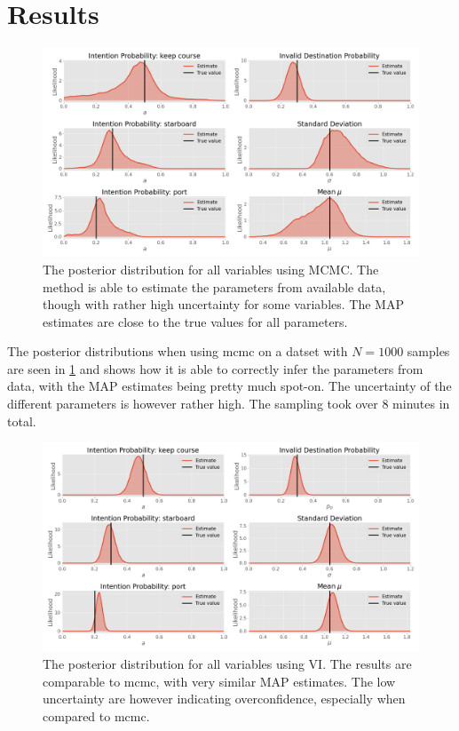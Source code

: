\section{Results}
\begin{figure}[h]
    \centering
    \includegraphics[width=\textwidth]{figures/example_mcmc.png}
    \caption{The posterior distribution for all variables using MCMC. The method is able to estimate the parameters from available data, though with rather high uncertainty for some variables. The MAP estimates are close to the true values for all parameters.}
    \label{fig:example_mcmc_posterior}
\end{figure}

The posterior distributions when using \acrshort{mcmc} on a datset with $N=1000$ samples are seen in \cref{fig:example_mcmc_posterior} and shows how it is able to correctly infer the parameters from data, with the MAP estimates being pretty much spot-on. The uncertainty of the different parameters is however rather high. The sampling took over 8 minutes in total. 

\begin{figure}[h]
    \centering
    \includegraphics[width=\textwidth]{figures/example_vi.png}
    \caption{The posterior distribution for all variables using VI. The results are comparable to \acrshort{mcmc}, with very similar MAP estimates. The low uncertainty are however indicating overconfidence, especially when compared to \acrshort{mcmc}.}
    \label{fig:example_vi_posterior}
\end{figure}


